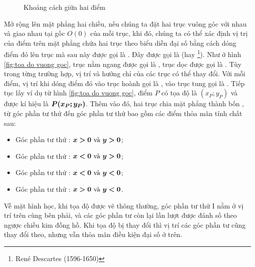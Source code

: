 \begin{figure}[H]
\begin{minipage}[b]{0.48\textwidth}
      \caption{Khoảng cách giữa hai điểm}
      \label{fig:khoang cach 2d}
   \end{minipage}
\end{figure}


Mở rộng lên mặt phẳng hai chiều, nếu chúng ta đặt hai trục vuông góc với nhau và giao nhau tại gốc $O(0)$ của mỗi trục, khi đó, chúng ta có thể xác định vị trị của điểm trên mặt phẳng chứa hai trục theo biểu diễn đại số bằng cách dóng điểm đó lên trục mà sau này được gọi là . Đây được gọi là  (hay \footnote{René Descartes (1596-1650)}). Như ở hình \ref{fig:toa do vuong goc}, trục nằm ngang được gọi là , trục dọc được gọi là . Tùy trong từng trường hợp, vị trí và hướng chỉ của các trục có thể thay đổi. Với mỗi điểm, vị trí khi dóng điểm đó vào trục hoành gọi là , vào trục tung gọi là . Tiếp tục lấy ví dụ từ hình \ref{fig:toa do vuong goc}, điểm $P$ có tọa độ là $(x_P;y_P)$ và được kí hiệu là $\bm{P(x_P;y_P)}$. Thêm vào đó, hai trục chia mặt phẳng thành bốn , từ góc phần tư thứ  đến góc phần tư thứ  bao gồm các điểm thỏa mãn tính chất sau:
\begin{itemize}
   \item Góc phần tư thứ : $\bm{x>0 \text{ và } y>0}$;
   \item Góc phần tư thứ : $\bm{x<0 \text{ và } y>0}$;
   \item Góc phần tư thứ : $\bm{x<0 \text{ và } y<0}$;
   \item Góc phần tư thứ : $\bm{x>0 \text{ và } y<0}$.
\end{itemize}
Về mặt hình học, khi tọa độ được vẽ thông thường, góc phần tư thứ I nằm ở vị trí trên cùng bên phải, và các góc phần tư còn lại lần lượt được \textcolor{colorEmphasisCyan}{đánh số theo ngược chiều kim đồng hồ}. Khi tọa độ bị thay đổi thì vị trí các góc phần tư cũng thay đổi theo, nhưng vẫn thỏa mãn điều kiện đại số ở trên. 

